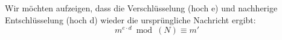 Wir möchten aufzeigen, dass die Verschlüsselung (hoch e) und nachherige Entschlüsselung (hoch d) wieder die ursprüngliche Nachricht ergibt:
\begin{equation*}
 m^{e \cdot d} \bmod(N) \equiv m' 
\end{equation*}
%
%
%
%
%
